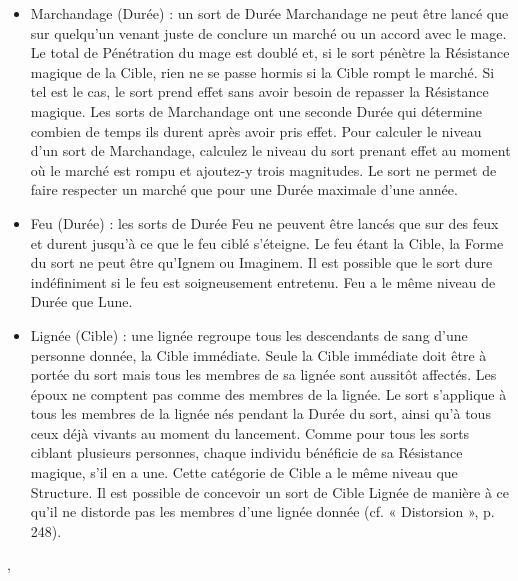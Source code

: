 {{\begin{itemize}
\item Marchandage (Durée) : un sort de Durée Marchandage ne peut être lancé que sur quelqu'un venant juste de conclure un marché ou un accord avec le mage. Le total de Pénétration du mage est doublé et, si le sort pénètre la Résistance magique de la Cible, rien ne se passe hormis si la Cible rompt le marché. Si tel est le cas, le sort prend effet sans avoir besoin de repasser la Résistance magique. Les sorts de Marchandage ont une seconde Durée qui détermine combien de temps ils durent après avoir pris effet. Pour calculer le niveau d'un sort de Marchandage, calculez le niveau du sort prenant effet au moment où le marché est rompu et ajoutez-y trois magnitudes. Le sort ne permet de faire respecter un marché que pour une Durée maximale d'une année.

\item Feu (Durée) : les sorts de Durée Feu ne peuvent être lancés que sur des feux et durent jusqu'à ce que le feu ciblé s'éteigne. Le feu étant la Cible, la Forme du sort ne peut être qu'Ignem ou Imaginem. Il est possible que le sort dure indéfiniment si le feu est soigneusement entretenu. Feu a le même niveau de Durée que Lune.

\item Lignée (Cible) : une lignée regroupe tous les descendants de sang d'une personne donnée, la Cible immédiate. Seule la Cible immédiate doit être à portée du sort mais tous les membres de sa lignée sont aussitôt affectés. Les époux ne comptent pas comme des membres de la lignée. Le sort s'applique à tous les membres de la lignée nés pendant la Durée du sort, ainsi qu'à tous ceux déjà vivants au moment du lancement. Comme pour tous les sorts ciblant plusieurs personnes, chaque individu bénéficie de sa Résistance magique, s'il en a une. Cette catégorie de Cible a le même niveau que Structure. Il est possible de concevoir un sort de Cible Lignée de manière à ce qu'il ne distorde pas les membres d'une lignée donnée (cf. « Distorsion », p. 248).\end{itemize}
}\sep
{}}
